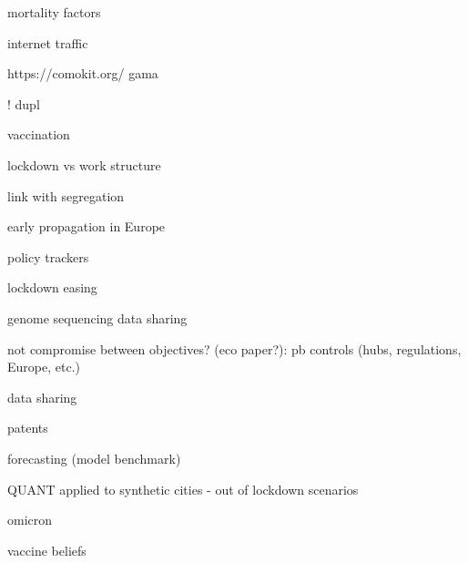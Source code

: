 \documentclass[10pt]{article}
\begin{document}
\cite{williamson2020opensafely} mortality factors

\cite{feldmann2020lockdown} internet traffic

https://comokit.org/ gama \cite{gaudou2020comokit}

\cite{murphy2020inside}

\cite{pullano2020underdetection}

\cite{mallapaty2020what}

\cite{Schlosser32883}

\cite{trump2020combine}

\cite{pullano2020underdetection} ! dupl

\cite{mallapaty2021covid} vaccination

\cite{heroy2020controlling} lockdown vs work structure

\cite{mallapaty2021major}

\cite{meng2021covid}

\cite{Torrats-Espinosae2015577118} link with segregation

\cite{nadeau2021origin} early propagation in Europe

\cite{schiermeier2021which} policy trackers

\cite{aschwanden2021five}

\cite{Shumskye2019225118}

\cite{cheetham2021determining}

\cite{irwin2021what}

\cite{mallapaty2021after}

\cite{10.1093/jtm/taab045}

\cite{mallapaty2021india}

\cite{andronico2021scenarios} lockdown easing

\cite{vogel2021do}

\cite{maxmen2021one} genome sequencing data sharing

\cite{oliu2021sars} not compromise between objectives? (eco paper?): pb controls (hubs, regulations, Europe, etc.)

\cite{maxmen2021why} data sharing

\cite{maxmen2021shock} patents

\cite{friedman2021forecasts} forecasting (model benchmark)

\cite{batty2021socially} QUANT applied to synthetic cities - out of lockdown scenarios

\cite{adam2022will} omicron

\cite{doi:10.1073/pnas.2118721119} vaccine beliefs
\end{document}
